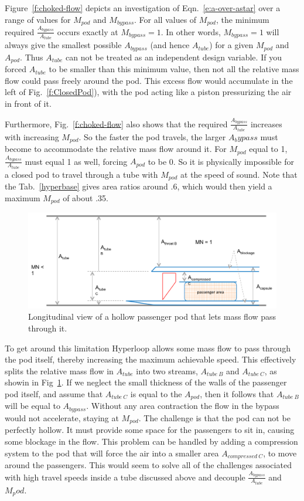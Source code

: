 \documentclass[heading.tex]{subfiles}
\begin{document}
Figure~\ref{f:choked-flow} depicts an investigation of Eqn.~\ref{e:a-over-astar} over a range of values for $M_{pod}$ and $M_{bypass}$. 
For all values of $M_{pod}$, the minimum required $\frac{A_{bypass}}{A_{tube}}$ occurs exactly at $M_{bypass}=1$. In other words, 
$M_{bypass}=1$ will always give the smallest possible $A_{bypass}$ (and hence $A_{tube}$) for a given 
$M_{pod}$ and $A_{pod}$. Thus $A_{tube}$ can not be treated as an independent design variable. If you forced $A_{tube}$ to be
smaller than this minimum value, then not all the relative mass flow could pass freely around the pod. This excess 
flow would accumulate in the left of Fig.~\ref{f:ClosedPod}), with the pod acting like a piston pressurizing the 
air in front of it. 

Furthermore, Fig.~\ref{f:choked-flow} also shows that the required $\frac{A_{bypass}}{A_{tube}}$ 
increases with increasing $M_{pod}$. So the faster the pod travels, the larger $A_bypass$ 
must become to accommodate the relative mass flow around it. For $M_{pod}$ equal to 1, $\frac{A_{bypass}}{A_{tube}}$ must 
equal 1 as well, forcing $A_{pod}$ to be 0. So it is physically impossible for a closed pod to travel through a 
tube with $M_{pod}$ at the speed of sound. Note that the Tab.~\ref{hyperbase} gives area ratios around .6, 
which would then yield a maximum $M_{pod}$ of about .35. 

\begin{figure}[hbtp]
\centering
\includegraphics[width=.85\textwidth]{images/hollowCapsule}
\caption{Longitudinal view of a hollow passenger pod that lets mass flow pass through it.}
\label{f:hollowPod}
\end{figure}

To get around this limitation Hyperloop allows some mass flow to pass through the pod itself, thereby increasing
the maximum achievable speed. This effectively splits the relative mass flow in $A_{tube}$ into two streams, 
$A_{tube\ B}$ and  $A_{tube\ C}$, as showin in Fig~\ref{f:hollowPod}. If we neglect the small thickness of the walls of
the passenger pod itself, and assume that $A_{tube\ C}$ is equal to the $A_{pod}$, then it follows that $A_{tube\ B}$ 
will be equal to $A_{bypass}$. Without any area contraction the flow in the bypass would not accelerate, staying 
at $M_{pod}$. The challenge is that the pod can not be perfectly hollow. It must provide some space for the passengers
to sit in, causing some blockage in the flow. This problem can be handled by adding a compression system to the 
pod that will force the air into a smaller area $A_{compressed\ C}$, to move around the passengers. This would 
seem to solve all of the challenges associated with high travel speeds inside a tube discussed above and decouple 
$\frac{A_{bypass}}{A_{tube}}$ and ${M_pod}$.
\end{document}
